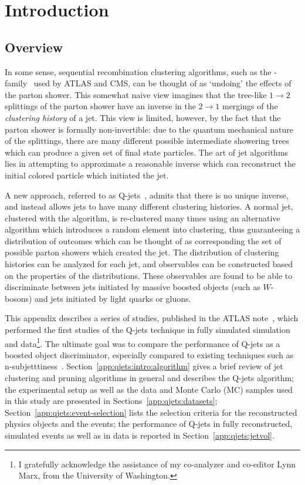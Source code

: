 \label{appendix:qjets}

\section{Introduction}

\subsection{Overview}
\label{app:qjets:intro:overview}

In some sense, sequential recombination clustering algorithms, such as the \kt-family~\cite{Ellis:1993tq} used by ATLAS and CMS, can be thought of as `undoing' the effects of the parton shower. This somewhat naive view imagines that the tree-like $1\rightarrow2$ splittings of the parton shower have an inverse in the $2\rightarrow1$ mergings of the \textit{clustering history} of a jet. This view is limited, however, by the fact that the parton shower is formally non-invertible: due to the quantum mechanical nature of the splittings, there are many different possible intermediate showering trees which can produce a given set of final state particles. The art of jet algorithms lies in attempting to approximate a reasonable inverse which can reconstruct the initial colored particle which initiated the jet.

A new approach, referred to as Q-jets~\cite{Ellis:2012sn}, admits that there is no unique inverse, and instead allows jets to have many different clustering histories. A normal jet, clustered with the \antikt algorithm, is re-clustered many times using an alternative algorithm which introduces a random element into clustering, thus guaranteeing a distribution of outcomes which can be thought of as corresponding the set of possible parton showers which created the jet. The distribution of clustering histories can be analyzed for each jet, and observables can be constructed based on the properties of the distributions. These observables are found to be able to discriminate between jets initiated by massive boosted objects (such as $W$-bosons) and jets initiated by light quarks or gluons.

This appendix describes a series of studies, published in the ATLAS note~\cite{ATLAS-CONF-2013-087}, which performed the first studies of the Q-jets technique in fully simulated simulation and data\footnote{I gratefully acknowledge the assistance of my co-analyzer and co-editor Lynn Marx, from the University of Washington.}. The ultimate goal was to compare the performance of Q-jets as a boosted object discriminator, especially compared to existing techniques such as n-subjetttiness~\cite{nsub}. Section~\ref{app:qjets:intro:algorithm} gives a brief review of jet clustering and pruning algorithms in general and describes the Q-jets algorithm; the experimental setup as well as the data and Monte Carlo (MC) samples used in this study are presented in Sections~\ref{app:qjets:datasets}; Section~\ref{app:qjets:event-selection} lists the selection criteria for the reconstructed physics objects and the events; the performance of Q-jets in fully reconstructed, simulated events as well as in data is reported in Section~\ref{app:qjets:jetvol}.



